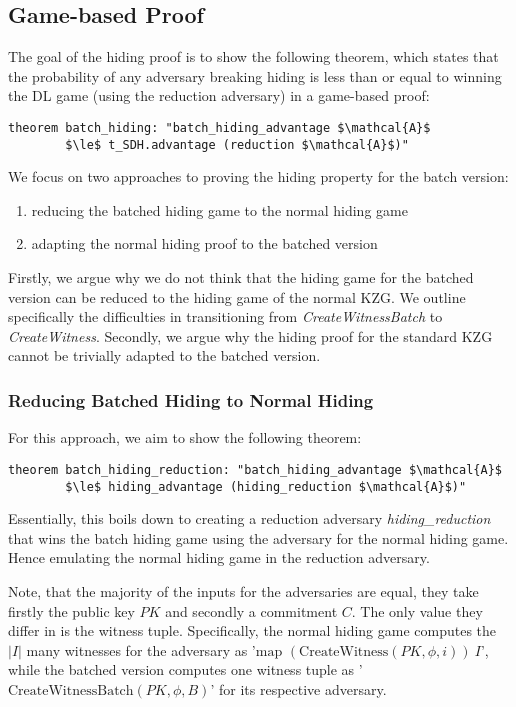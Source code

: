 \subsection*{Game-based Proof}
The goal of the hiding proof is to show the following theorem, which states that the probability of any adversary breaking hiding is less than or equal to winning the DL game (using the reduction adversary) in a game-based proof:
\begin{lstlisting}[language=isabelle]
    theorem batch_hiding: "batch_hiding_advantage $\mathcal{A}$ 
        $\le$ t_SDH.advantage (reduction $\mathcal{A}$)"
\end{lstlisting}

We focus on two approaches to proving the hiding property for the batch version: 
\begin{enumerate}
    \item reducing the batched hiding game to the normal hiding game 
    \item adapting the normal hiding proof to the batched version
\end{enumerate}
Firstly, we argue why we do not think that the hiding game for the batched version can be reduced to the hiding game of the normal KZG. We outline specifically the difficulties in transitioning from \textit{CreateWitnessBatch} to \textit{CreateWitness}.
Secondly, we argue why the hiding proof for the standard KZG cannot be trivially adapted to the batched version.

\subsubsection*{Reducing Batched Hiding to Normal Hiding}
For this approach, we aim to show the following theorem: 
\begin{lstlisting}[language=isabelle]
    theorem batch_hiding_reduction: "batch_hiding_advantage $\mathcal{A}$ 
        $\le$ hiding_advantage (hiding_reduction $\mathcal{A}$)"
\end{lstlisting}

Essentially, this boils down to creating a reduction adversary \textit{hiding\_reduction} that wins the batch hiding game using the adversary for the normal hiding game. Hence emulating the normal hiding game in the reduction adversary.

Note, that the majority of the inputs for the adversaries are equal, they take firstly the public key $PK$ and secondly a commitment $C$. The only value they differ in is the witness tuple. Specifically, the normal hiding game computes the $|I|$ many witnesses for the adversary as '$\text{map } (\text{CreateWitness}(PK,\phi,i))\ I$', while the batched version computes one witness tuple as '$\text{CreateWitnessBatch}(PK,\phi,B)$' for its respective adversary.

